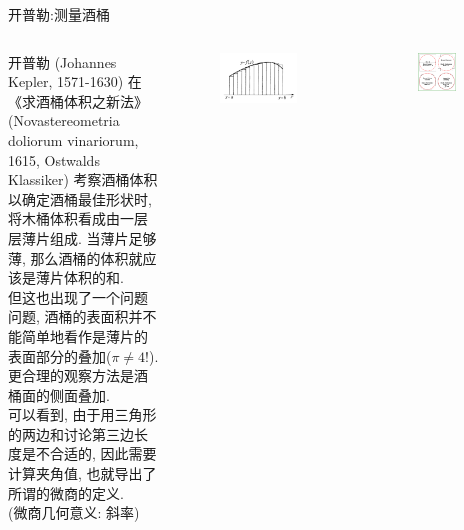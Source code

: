 \documentclass[
10pt,
aspectratio=43,
]{beamer}
\begin{document}
\begin{frame}{开普勒:测量酒桶}
    \begin{columns}
        开普勒 (Johannes Kepler, 1571-1630) 在《求酒桶体积之新法》 (Novastereometria doliorum vinariorum, 1615, Ostwalds Klassiker) 考察酒桶体积以确定酒桶最佳形状时, 将木桶体积看成由一层层薄片组成. 当薄片足够薄, 那么酒桶的体积就应该是薄片体积的和.\\
        \pause
        \vspace{0.5cm}
        但这也出现了一个问题问题, 酒桶的表面积并不能简单地看作是薄片的表面部分的叠加($\pi\neq4$!). \pause 更合理的观察方法是酒桶面的侧面叠加.\\
        \pause
        \vspace{0.5cm}
        {\small \color{blue}
            可以看到, 由于用三角形的两边和讨论第三边长度是不合适的, 因此需要计算夹角值, 也就导出了所谓的微商的定义.\\
            \pause
            \vspace{0.1cm}
            (微商几何意义: 斜率)
        }
        \begin{figure}
            \includegraphics[width=0.8\textwidth]{wine_barrel_function.png}
        \end{figure}
        \begin{figure}
            \includegraphics[width=0.7\textwidth]{pi-4.png}
        \end{figure}
    \end{columns}
\end{frame}
\end{document}
